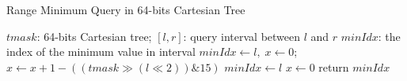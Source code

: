 \begin{algorithm*}[!thb]
  \caption{Range Minimum Query in 64-bits Cartesian Tree}
  \label{alg:cartesian64bits-query}
  \begin{algorithmic}[1]
    \Require
      $\textit{tmask}$: 64-bits Cartesian tree;
      $[l, r]$: query interval between $l$ and $r$
    \Ensure 
      $\textit{minIdx}$: the index of the minimum value in interval
    \State $\textit{minIdx} \gets l, \; x \gets 0$;
      \State $x \gets x+1 - ((\textit{tmask} \gg (l \ll 2)) \mathrel{\&} 15)$
        \State $\textit{minIdx} \gets l$
        \State $x \gets 0$
      \EndIf
    \EndFor
    \State return $\textit{minIdx}$
  \end{algorithmic}
\end{algorithm*}
